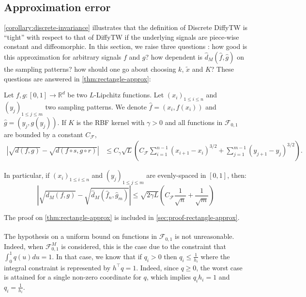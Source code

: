 \subsection{Approximation error}
\cref{corollary:discrete-invariance} illustrates that the definition of Discrete DiffyTW is ``tight'' with respect to that of DiffyTW if the underlying signals are piece-wise constant and diffeomorphic. In this section, we raise three questions : how good is this approximation for arbitrary signals $f$ and $g$? how dependent is $\hat d_M(\hat f, \hat g)$ on the sampling patterns? how should one go about choosing $k$, $\tilde x$ and $K$? These questions are answered in \cref{thm:rectangle-approx}:

\begin{theorem}\label{thm:rectangle-approx}
Let $f,g:[0,1] \to \mathbb R^d$ be two $L$-Lipchitz functions. Let $(x_i)_{1\leq i \leq n}$ and $(y_j)_{1\leq j\leq m}$ two sampling patterns. We denote $\hat f = (x_i, f(x_i))$ and $\hat g = (y_j, g(y_j))$.
If $K$ is the RBF kernel with $\gamma > 0$ and all functions in $\mathcal F_{0,1}$ are bounded by a constant $C_\mathcal F$,
\begin{align}
    \left\vert \sqrt{d(f, g)} - \sqrt{d(f \circ s, g\circ r)} \right\vert &\leq C_\gamma \sqrt{L}\left(C_\mathcal F \sum_{i=1}^{n-1} (x_{i+1} - x_i)^{3/2} + \sum_{j=1}^{m-1}(y_{j+1} - y_j)^{3/2}\right).
\end{align}

In particular, if $(x_i)_{1\leq i\leq n}$ and $(y_j)_{1 \leq j \leq m}$ are evenly-spaced in $[0,1]$, then:
\begin{equation}
    \left\vert \sqrt{d_M(f, g)} - \sqrt{\hat d_M(\hat f_n, \hat g_m)}\right\vert \leq \sqrt{2\gamma L}\left(C_\mathcal F\frac{1}{\sqrt{n}} + \frac{1}{\sqrt{m}}\right)
\end{equation}
\end{theorem}

The proof on \cref{thm:rectangle-approx} is included in \cref{sec:proof-rectangle-approx}.

\paragraph{}
The hypothesis on a uniform bound on functions in $\mathcal F_{0,1}$ is not unreasonable. Indeed, when $\mathcal F_{0,1}^M$ is considered, this is the case due to the constraint that $\int_0^1 q(u)du = 1$. In that case, we know that if $q_i >0$ then $q_i \leq \frac{1}{h_i}$ where the integral constraint is represented by $h^\top q =1$. Indeed, since $q \geq 0$, the worst case is attained for a single non-zero coordinate for $q$, which implies $q_ih_i = 1$ and $q_i = \frac{1}{h_i}$.

